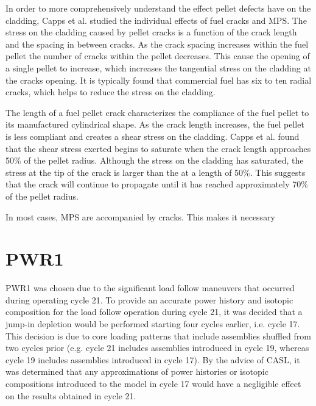 \documentclass[edeposit,fullpage,12pt]{uiucthesis2009}
\begin{document}


In order to more comprehensively understand the effect pellet defects have on the cladding, Capps et al. studied the individual effects of fuel cracks and \gls{MPS}.
The stress on the cladding caused by pellet cracks is a function of the crack length and the spacing in between cracks.
As the crack spacing increases within the fuel pellet the number of cracks within the pellet decreases.
This cause the opening of a single pellet to increase, which increases the tangential stress on the cladding at the cracks opening.
It is typically found that commercial fuel has six to ten radial cracks, which helps to reduce the stress on the cladding.

The length of a fuel pellet crack characterizes the compliance of the fuel pellet to its manufactured cylindrical shape.
As the crack length increases, the fuel pellet is less compliant and creates a shear stress on the cladding.
Capps et al. found that the shear stress exerted begins to saturate when the crack length approaches 50\% of the pellet radius.
Although the stress on the cladding has saturated, the stress at the tip of the crack is larger than the  at a length of 50\%. %
This suggests that the crack will continue to propagate until it has reached approximately 70\% of the pellet radius.

In most cases, \gls{MPS} are accompanied by cracks.
This makes it necessary 


\chapter{PWR1}
PWR1 was chosen due to the significant load follow maneuvers that occurred during operating cycle 21. 
To provide an accurate power history and isotopic composition for the load follow operation during cycle 21, it was decided that a jump-in depletion would be performed starting four cycles earlier, i.e. cycle 17. 
This decision is due to core loading patterns that include assemblies shuffled from two cycles prior (e.g. cycle 21 includes assemblies introduced in cycle 19, whereas cycle 19 includes assemblies introduced in cycle 17). 
By the advice of CASL, it was determined that any approximations of power histories or isotopic compositions introduced to the model in cycle 17 would have a negligible effect on the results obtained in cycle 21.
\end{document}
